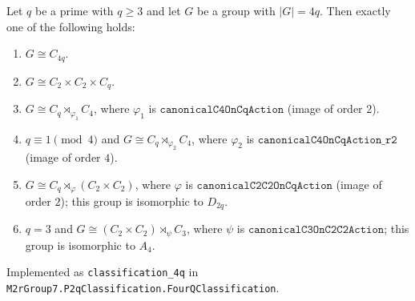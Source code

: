 \begin{theorem}
    \label{thm:classification-4q}
    Let $q$ be a prime with $q \geq 3$ and let $G$ be a group with $|G| = 4q$.
    Then exactly one of the following holds:
    \begin{enumerate}
        \item $G \cong C_{4q}$.
        \item $G \cong C_2 \times C_2 \times C_q$.
        \item $G \cong C_q \rtimes_{\varphi_1} C_4$, where $\varphi_1$ is
            $\mathtt{canonicalC4OnCqAction}$ (image of order $2$).
        \item $q \equiv 1 \pmod 4$ and $G \cong C_q \rtimes_{\varphi_2} C_4$,
            where $\varphi_2$ is $\mathtt{canonicalC4OnCqAction\_r2}$ (image
            of order $4$).
        \item $G \cong C_q \rtimes_\varphi (C_2 \times C_2)$, where $\varphi$
            is $\mathtt{canonicalC2C2OnCqAction}$ (image of order $2$);
            this group is isomorphic to $D_{2q}$.
        \item $q = 3$ and $G \cong (C_2 \times C_2) \rtimes_\psi C_3$, where
            $\psi$ is $\mathtt{canonicalC3OnC2C2Action}$; this group is
            isomorphic to $A_4$.
    \end{enumerate}
    Implemented as \texttt{classification\_4q} in
    \texttt{M2rGroup7.P2qClassification.FourQClassification}.
\end{theorem}
